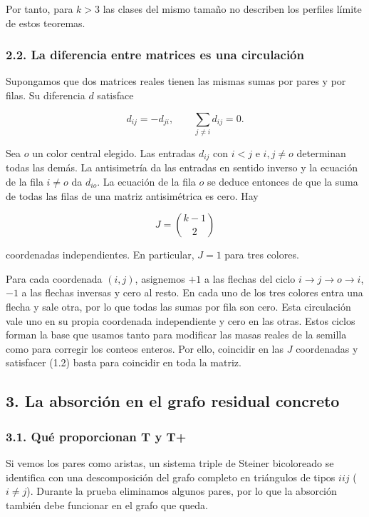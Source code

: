 \documentclass[spanish,11pt,a4paper]{article}
\begin{document}
Por tanto, para \(k>3\) las clases del mismo tamaño no describen los perfiles límite de estos teoremas.

\subsubsection{2.2. La diferencia entre matrices es una circulación}\label{la-diferencia-entre-matrices-es-una-circulaciuxf3n}

Supongamos que dos matrices reales tienen las mismas sumas por pares y por filas. Su diferencia \(d\) satisface

\[d_{ij}=-d_{ji},\qquad \sum_{j\ne i}d_{ij}=0.\tag{2.2}\]

Sea \(o\) un color central elegido. Las entradas \(d_{ij}\) con \(i<j\) e \(i,j\ne o\) determinan todas las demás. La antisimetría da las entradas en sentido inverso y la ecuación de la fila \(i\ne o\) da \(d_{io}\). La ecuación de la fila \(o\) se deduce entonces de que la suma de todas las filas de una matriz antisimétrica es cero. Hay

\[J=\binom{k-1}{2}\]

coordenadas independientes. En particular, \(J=1\) para tres colores.

Para cada coordenada \((i,j)\), asignemos \(+1\) a las flechas del ciclo \(i\to j\to o\to i\), \(-1\) a las flechas inversas y cero al resto. En cada uno de los tres colores entra una flecha y sale otra, por lo que todas las sumas por fila son cero. Esta circulación vale uno en su propia coordenada independiente y cero en las otras. Estos ciclos forman la base que usamos tanto para modificar las masas reales de la semilla como para corregir los conteos enteros. Por ello, coincidir en las \(J\) coordenadas y satisfacer (1.2) basta para coincidir en toda la matriz.

\subsection{3. La absorción en el grafo residual concreto}\label{la-absorciuxf3n-en-el-grafo-residual-concreto}

\subsubsection{3.1. Qué proporcionan T y T+}\label{quuxe9-proporcionan-t-y-t}

Si vemos los pares como aristas, un sistema triple de Steiner bicoloreado se identifica con una descomposición del grafo completo en triángulos de tipos \(iij\) (\(i\ne j\)). Durante la prueba eliminamos algunos pares, por lo que la absorción también debe funcionar en el grafo que queda.
\end{document}
